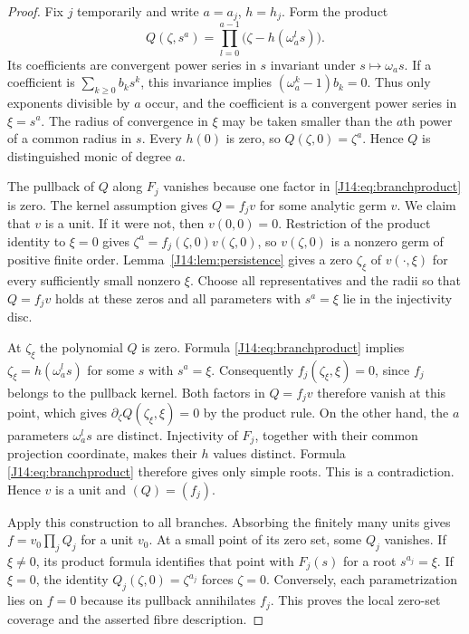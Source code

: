 \documentclass[11pt,oneside]{report}
\theoremstyle{definition}
\numberwithin{equation}{section}
\begin{document}
\begin{proof}
Fix $j$ temporarily and write $a=a_j$, $h=h_j$.
Form the product
\begin{equation}\label{J14:eq:branchproduct}
 Q(\zeta,s^a)=\prod_{l=0}^{a-1}
       \bigl(\zeta-h(\omega_a^l s)\bigr).
\end{equation}
Its coefficients are convergent power series in $s$ invariant under
$s\mapsto\omega_a s$. If a coefficient is $\sum_{k\geq0}b_k s^k$,
this invariance implies $(\omega_a^k-1)b_k=0$.
Thus only exponents divisible by $a$ occur, and the coefficient is a
convergent power series in $\xi=s^a$. The radius of convergence in $\xi$
may be taken smaller than the $a$th power of a common radius in $s$.
Every $h(0)$ is zero, so $Q(\zeta,0)=\zeta^a$.
Hence $Q$ is distinguished monic of degree $a$.

The pullback of $Q$ along $F_j$ vanishes because one factor in
\eqref{J14:eq:branchproduct} is zero. The kernel assumption gives
$Q=f_jv$ for some analytic germ $v$. We claim that $v$ is a unit.
If it were not, then $v(0,0)=0$.
Restriction of the product identity to $\xi=0$ gives
$\zeta^a=f_j(\zeta,0)v(\zeta,0)$, so $v(\zeta,0)$ is a nonzero germ of
positive finite order. Lemma~\ref{J14:lem:persistence} gives a zero
$\zeta_\xi$ of $v(\cdot,\xi)$ for every sufficiently small nonzero $\xi$.
Choose all representatives and the radii so that $Q=f_jv$ holds at these
zeros and all parameters with $s^a=\xi$ lie in the injectivity disc.

At $\zeta_\xi$ the polynomial $Q$ is zero. Formula
\eqref{J14:eq:branchproduct} implies $\zeta_\xi=h(\omega_a^l s)$ for some
$s$ with $s^a=\xi$. Consequently $f_j(\zeta_\xi,\xi)=0$, since $f_j$
belongs to the pullback kernel. Both factors in $Q=f_jv$ therefore vanish
at this point, which gives $\partial_\zeta Q(\zeta_\xi,\xi)=0$ by the
product rule. On the other hand, the $a$ parameters $\omega_a^l s$ are
distinct. Injectivity of $F_j$, together with their common projection
coordinate, makes their $h$ values distinct. Formula
\eqref{J14:eq:branchproduct} therefore gives only simple roots. This is a
contradiction. Hence $v$ is a unit and $(Q)=(f_j)$.

Apply this construction to all branches. Absorbing the finitely many units
gives $f=v_0\prod_jQ_j$ for a unit $v_0$. At a small point of its zero
set, some $Q_j$ vanishes. If $\xi\ne0$, its product formula identifies that
point with $F_j(s)$ for a root $s^{a_j}=\xi$. If $\xi=0$, the identity
$Q_j(\zeta,0)=\zeta^{a_j}$ forces $\zeta=0$. Conversely, each
parametrization lies on $f=0$ because its pullback annihilates $f_j$.
This proves the local zero-set coverage and the asserted fibre description.


\end{proof}
\end{document}
